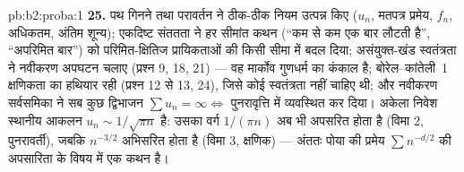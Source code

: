 \begin{solution}{pb:b2:proba:1}
\textbf{25.} पथ गिनने तथा परावर्तन ने ठीक-ठीक नियम उत्पन्न किए
($u_n$, मतपत्र प्रमेय, $f_n$, अधिकतम, अंतिम शून्य); एकदिष्ट संततता ने
हर सीमांत कथन (``कम से कम एक बार लौटती है'', ``अपरिमित बार'') को
परिमित-क्षितिज प्रायिकताओं की किसी सीमा में बदल दिया;
असंयुक्त-खंड स्वतंत्रता ने नवीकरण अपघटन चलाए (प्रश्न 9, 18, 21)
--- वह मार्कोव गुणधर्म का  कंकाल है; बोरेल--कांतेली~1
क्षणिकता का हथियार रही (प्रश्न 12 से 13, 24), जिसे कोई स्वतंत्रता
नहीं चाहिए थी; और नवीकरण सर्वसमिका ने सब कुछ द्विभाजन $\sum u_n = \infty \iff$
पुनरावृत्ति में व्यवस्थित कर दिया। अकेला  निवेश स्थानीय
आकलन $u_n \sim 1/\sqrt{\pi
n}$ है: उसका वर्ग $1/(\pi n)$ अब भी अपसरित होता है (विमा $2$,
पुनरावर्ती), जबकि $n^{-3/2}$ अभिसरित होता है (विमा $3$, क्षणिक) --- अंततः
पोया की प्रमेय $\sum n^{-d/2}$ की अपसारिता के विषय में एक कथन है।
\end{solution}
